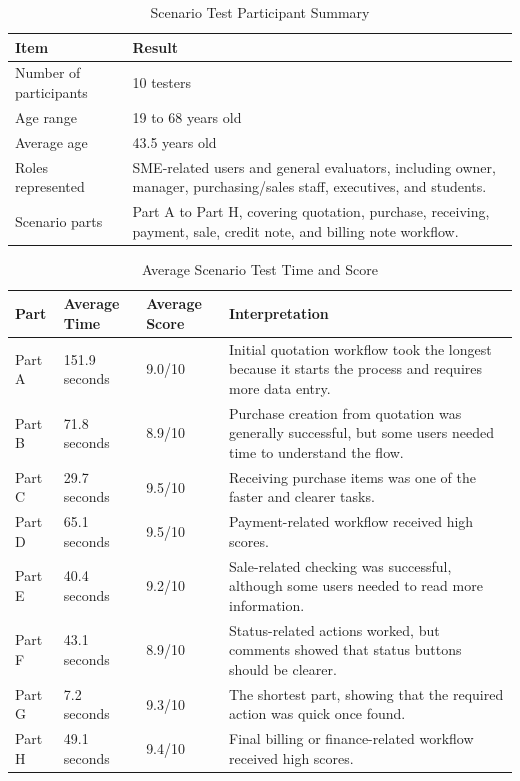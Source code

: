 \begin{table}[H]
	\centering
	\BlackbookTableSetup
	\caption{Scenario Test Participant Summary}
	\label{tab:scenario-test-participant-summary}
	\begin{tabularx}{\textwidth}{|B{3.5cm}|Z|}
		\hline
		\textbf{Item} & \textbf{Result} \\ \hline
		Number of participants & 10 testers \\ \hline
		Age range & 19 to 68 years old \\ \hline
		Average age & 43.5 years old \\ \hline
		Roles represented & SME-related users and general evaluators, including owner, manager, purchasing/sales staff, executives, and students. \\ \hline
		Scenario parts & Part A to Part H, covering quotation, purchase, receiving, payment, sale, credit note, and billing note workflow. \\ \hline
	\end{tabularx}
\end{table}

\begin{table}[H]
	\centering
	\BlackbookTableSetup
	\caption{Average Scenario Test Time and Score}
	\label{tab:scenario-test-average-result}
	\begin{tabularx}{\textwidth}{|D{1.5cm}|B{2.2cm}|B{2cm}|Z|}
		\hline
		\textbf{Part} & \textbf{Average Time} & \textbf{Average Score} & \textbf{Interpretation} \\ \hline
		Part A & 151.9 seconds & 9.0/10 & Initial quotation workflow took the longest because it starts the process and requires more data entry. \\ \hline
		Part B & 71.8 seconds & 8.9/10 & Purchase creation from quotation was generally successful, but some users needed time to understand the flow. \\ \hline
		Part C & 29.7 seconds & 9.5/10 & Receiving purchase items was one of the faster and clearer tasks. \\ \hline
		Part D & 65.1 seconds & 9.5/10 & Payment-related workflow received high scores. \\ \hline
		Part E & 40.4 seconds & 9.2/10 & Sale-related checking was successful, although some users needed to read more information. \\ \hline
		Part F & 43.1 seconds & 8.9/10 & Status-related actions worked, but comments showed that status buttons should be clearer. \\ \hline
		Part G & 7.2 seconds & 9.3/10 & The shortest part, showing that the required action was quick once found. \\ \hline
		Part H & 49.1 seconds & 9.4/10 & Final billing or finance-related workflow received high scores. \\ \hline
	\end{tabularx}
\end{table}

